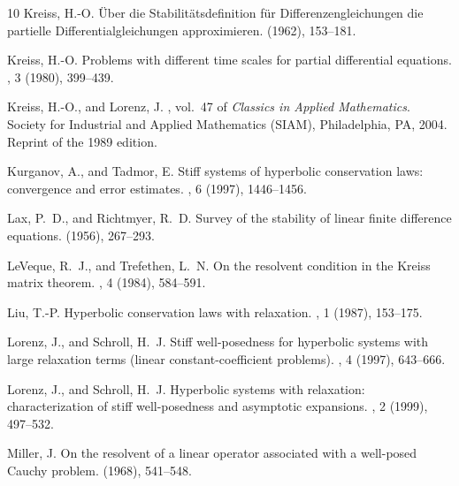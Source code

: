 \documentclass{article}
\theoremstyle{plain}%
\theoremstyle{definition}%
\theoremstyle{remark}%
\newcommand{\+}[1]{{\bm{#1}}}
\begin{document}
\begin{thebibliography}{10}
  {\sc Kreiss, H.-O.}
  \newblock \"{U}ber die {S}tabilit\"{a}tsdefinition f\"{u}r
    {D}ifferenzengleichungen die partielle {D}ifferentialgleichungen
    approximieren.
   (1962),
    153--181.
  
  {\sc Kreiss, H.-O.}
  \newblock Problems with different time scales for partial differential
    equations.
  , 3 (1980), 399--439.
  
  {\sc Kreiss, H.-O., and Lorenz, J.}
  , vol.~47 of {\em Classics in Applied Mathematics}.
  \newblock Society for Industrial and Applied Mathematics (SIAM), Philadelphia,
    PA, 2004.
  \newblock Reprint of the 1989 edition.
  
  {\sc Kurganov, A., and Tadmor, E.}
  \newblock Stiff systems of hyperbolic conservation laws: convergence and error
    estimates.
  , 6 (1997), 1446--1456.
  
  {\sc Lax, P.~D., and Richtmyer, R.~D.}
  \newblock Survey of the stability of linear finite difference equations.
   (1956), 267--293.
  
  {\sc LeVeque, R.~J., and Trefethen, L.~N.}
  \newblock On the resolvent condition in the {K}reiss matrix theorem.
  , 4 (1984), 584--591.
  
  {\sc Liu, T.-P.}
  \newblock Hyperbolic conservation laws with relaxation.
  , 1 (1987), 153--175.
  
  {\sc Lorenz, J., and Schroll, H.~J.}
  \newblock Stiff well-posedness for hyperbolic systems with large relaxation
    terms (linear constant-coefficient problems).
  , 4 (1997), 643--666.
  
  {\sc Lorenz, J., and Schroll, H.~J.}
  \newblock Hyperbolic systems with relaxation: characterization of stiff
    well-posedness and asymptotic expansions.
  , 2 (1999), 497--532.
  
  {\sc Miller, J.}
  \newblock On the resolvent of a linear operator associated with a well-posed
    {C}auchy problem.
   (1968), 541--548.
  

\end{thebibliography}
\end{document}
